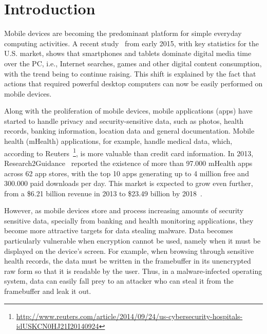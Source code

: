 
% 
% 
\section{Introduction}


Mobile devices are becoming the predominant platform for simple everyday computing activities.  A recent study~\cite{comscore} from early 2015, with key statistics for the U.S. market, shows that smartphones and tablets dominate digital media time over the \ac{PC}, i.e., Internet searches, games and other digital content consumption, with the trend being to continue raising. This shift is explained by the fact that actions that required powerful desktop computers can now be easily performed on mobile devices.

Along with the proliferation of mobile devices, mobile applications (apps) have started to handle privacy and security-sensitive data, such as photos, health records, banking information, location data and general documentation. Mobile health (mHealth) applications, for example, handle medical data, which, according to Reuters~\footnote{\url{http://www.reuters.com/article/2014/09/24/us-cybersecurity-hospitals-idUSKCN0HJ21I20140924}}, is more valuable than credit card information. In 2013, Research2Guidance~\cite{research2guidance} reported the existence of more than 97.000 mHealth apps across 62 app stores, with the top 10 apps generating up to 4 million free and 300.000 paid downloads per day. This market is expected to grow even further, from a \$6.21 billion revenue in 2013 to \$23.49 billion by 2018~\cite{marketsandmarkets}.

However, as mobile devices store and process increasing amounts of security sensitive data, specially from banking and health monitoring applications, they become more attractive targets for data stealing malware. Data becomes particularly vulnerable when encryption cannot be used, namely when it must be displayed on the device's screen. For example, when browsing through sensitive health records, the data must be written in the framebuffer in its unencrypted raw form so that it is readable by the user. Thus, in a malware-infected operating system, data can easily fall prey to an attacker who can steal it from the framebuffer and leak it out.

